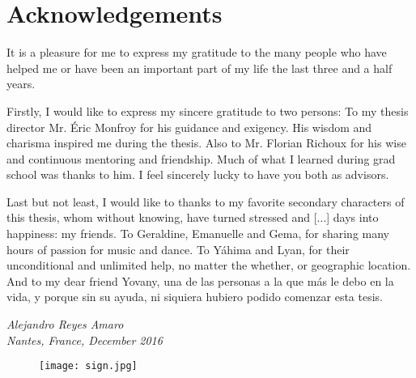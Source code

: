 \cleardoublepage
\chapter{Acknowledgements}
\vspace*{1cm}
It is a pleasure for me to express my gratitude to the many people who have helped me or have been an important part of my life the last three and a half years.

Firstly, I would like to express my sincere gratitude to two persons: To my thesis director Mr. Éric {\sc Monfroy} for his guidance and exigency. His wisdom and charisma inspired me during the thesis. Also to Mr. Florian {\sc Richoux} for his wise and continuous mentoring and friendship. Much of what I learned during grad school was thanks to him. I feel sincerely lucky to have you both as advisors.



Last but not least, I would like to thanks to my favorite secondary characters of this thesis, whom without knowing, have turned stressed and [...] days into happiness: my friends. To Geraldine, Emanuelle and Gema, for sharing many hours of passion for music and dance. To Yáhima and Lyan, for their unconditional and unlimited help, no matter the whether,  or geographic location. And to my dear friend Yovany, una de las personas a la que más le debo en la vida, y porque sin su ayuda, ni siquiera hubiero podido comenzar esta tesis.


\vspace*{1cm}
\begin{center}
\emph{
Alejandro {\sc Reyes Amaro}\\
\vspace*{0.1 cm}
Nantes, France, December 2016}
\begin{figure}[!h]
\centering
\texttt{[image: sign.jpg]}
\end{figure}
\end{center}
